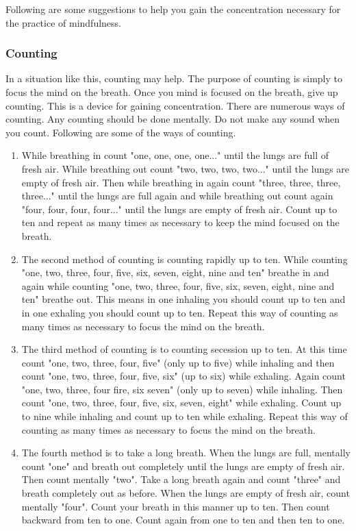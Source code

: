 Following are some suggestions to help you gain the concentration necessary for
the practice of mindfulness.
\subsubsection*{Counting}
In a situation like this, counting may help. The purpose of counting is simply to focus the mind on the breath. Once you mind is
focused on the breath, give up counting. This is a device for gaining concentration. There are numerous ways of counting. Any
counting should be done mentally. Do not make any sound when you count. Following are some of the ways of counting.

\begin{enumerate}
\item While breathing in count "one, one, one, one..." until the lungs are full of
fresh air. While breathing out count "two, two, two, two..." until the lungs are
empty of fresh air. Then while breathing in again count "three, three, three,
three..." until the lungs are full again and while breathing out count again
"four, four, four, four..." until the lungs are empty of fresh air. Count up to
ten and repeat as many times as necessary to keep the mind focused on the
breath.

\item The second method of counting is counting rapidly up to ten. While counting
"one, two, three, four, five, six, seven, eight, nine and ten" breathe in and
again while counting "one, two, three, four, five, six, seven, eight, nine and
ten" breathe out. This means in one inhaling you should count up to ten and in
one exhaling you should count up to ten. Repeat this way of counting as many
times as necessary to focus the mind on the breath.

\item The third method of counting is to counting secession up to ten. At this time
count "one, two, three, four, five" (only up to five) while inhaling and then
count "one, two, three, four, five, six" (up to six) while exhaling. Again count
"one, two, three, four fire, six seven" (only up to seven) while inhaling. Then
count "one, two, three, four, five, six, seven, eight" while exhaling. Count up
to nine while inhaling and count up to ten while exhaling. Repeat this way of
counting as many times as necessary to focus the mind on the breath.

\item The fourth method is to take a long breath. When the lungs are full, mentally
count "one" and breath out completely until the lungs are empty of fresh air.
Then count mentally "two". Take a long breath again and count "three" and breath
completely out as before. When the lungs are empty of fresh air, count mentally
"four". Count your breath in this manner up to ten. Then count backward from ten
to one. Count again from one to ten and then ten to one.


\end{enumerate}
